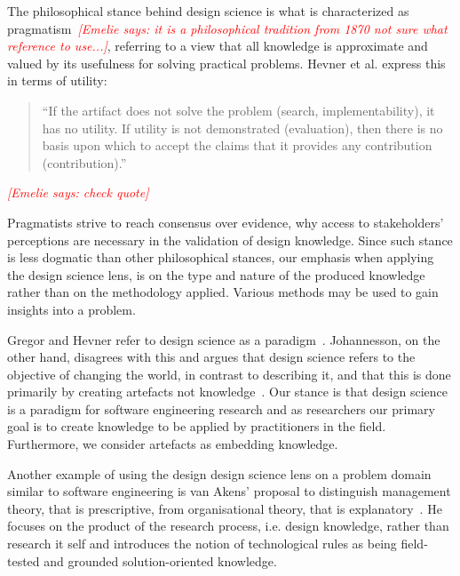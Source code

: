 \documentclass[graybox]{svmult}
\newcommand{\emelie}[1]{\textcolor{red}{{\it [Emelie says: #1]}}}
\newcommand{\emelie}[1]{}
\begin{document}
The philosophical stance behind design science is what is characterized as pragmatism~\cite{easterbrook_selecting_2008}\emelie{it is a philosophical tradition from 1870 not sure what reference to use...}, referring to a view that all knowledge is approximate and valued by its usefulness for solving practical problems. Hevner et al. express this in terms of utility: 

\begin{quote}
	``If the artifact does not solve the problem (search, implementability), it has no utility. If utility is not demonstrated (evaluation), then there is no basis upon which to accept the claims that it provides any contribution (contribution).''~\cite{hevner_design_2004}
\end{quote}\emelie{check quote} 

Pragmatists strive to reach consensus over evidence, why access to stakeholders' perceptions are necessary in the validation of design knowledge. Since such stance is less dogmatic than other philosophical stances, our emphasis when applying the design science lens, is on the type and nature of the produced knowledge rather than on the methodology applied. Various methods may be used to gain insights into a problem.

Gregor and Hevner refer to design science as a paradigm~\cite{gregor_positioning_2013}. Johannesson, on the other hand, disagrees with this and argues that design science refers to the objective of changing the world, in contrast to describing it, and that this is done primarily by creating artefacts not knowledge~\cite{johannesson_introduction_2014}. Our stance is that design science is a paradigm for software engineering research and as researchers our primary goal is to create knowledge to be applied by practitioners in the field. Furthermore, we consider artefacts as embedding knowledge. 



Another example of using the design design science lens on a problem domain similar to software engineering is van Akens' proposal to distinguish management theory, that is prescriptive, from organisational theory, that is explanatory~\cite{van_aken_management_2005}. He focuses on the product of the research process, i.e. design knowledge, rather than research it self and introduces the notion of technological rules as being field-tested and grounded solution-oriented knowledge. 
\end{document}
